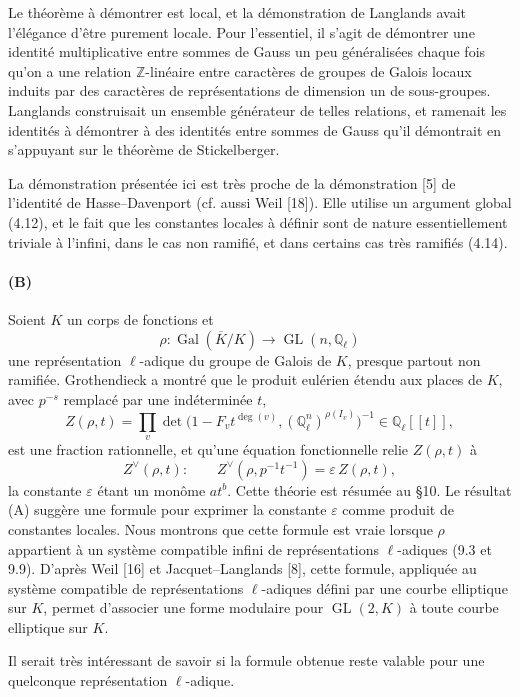 \documentclass[10pt]{article}
\newcommand{\Q}{\mathbb Q}
\newcommand{\Z}{\mathbb Z}
\newcommand{\Gal}{\operatorname{Gal}}
\newcommand{\GL}{\operatorname{GL}}
\providecommand{\Gal}{\operatorname{Gal}}
\providecommand{\GL}{\operatorname{GL}}
\providecommand{\Gal}{\operatorname{Gal}}
\providecommand{\GL}{\operatorname{GL}}
\providecommand{\Gal}{\operatorname{Gal}}
\providecommand{\Gal}{\operatorname{Gal}}
\begin{document}
Le théorème à démontrer est local, et la démonstration de Langlands avait l'élégance d'être purement locale. Pour l'essentiel, il s'agit de démontrer une identité multiplicative entre sommes de Gauss un peu généralisées chaque fois qu'on a une relation \(\Z\)-linéaire entre caractères de groupes de Galois locaux induits par des caractères de représentations de dimension un de sous-groupes. Langlands construisait un ensemble générateur de telles relations, et ramenait les identités à démontrer à des identités entre sommes de Gauss qu'il démontrait en s'appuyant sur le théorème de Stickelberger.

La démonstration présentée ici est très proche de la démonstration [5] de l'identité de Hasse--Davenport (cf. aussi Weil [18]). Elle utilise un argument global (4.12), et le fait que les constantes locales à définir sont de nature essentiellement triviale à l'infini, dans le cas non ramifié, et dans certains cas très ramifiés (4.14).

\paragraph{(B)} Soient \(K\) un corps de fonctions et
\[
\rho:\Gal(\overline K/K)\longrightarrow \GL(n,\Q_\ell)
\]
une représentation \(\ell\)-adique du groupe de Galois de \(K\), presque partout non ramifiée. Grothendieck a montré que le produit eulérien étendu aux places de \(K\), avec \(p^{-s}\) remplacé par une indéterminée \(t\),
\[
Z(\rho,t)=\prod_v\det\bigl(1-F_vt^{\deg(v)},(\Q_\ell^n)^{\rho(I_v)}\bigr)^{-1}
\in\Q_\ell[[t]],
\]
est une fraction rationnelle, et qu'une équation fonctionnelle relie \(Z(\rho,t)\) à
\[
Z^\vee(\rho,t):
\qquad
Z^\vee(\rho,p^{-1}t^{-1})=\varepsilon\, Z(\rho,t),
\]
la constante \(\varepsilon\) étant un monôme \(at^b\). Cette théorie est résumée au §10. Le résultat (A) suggère une formule pour exprimer la constante \(\varepsilon\) comme produit de constantes locales. Nous montrons que cette formule est vraie lorsque \(\rho\) appartient à un système compatible infini de représentations \(\ell\)-adiques (9.3 et 9.9). D'après Weil [16] et Jacquet--Langlands [8], cette formule, appliquée au système compatible de représentations \(\ell\)-adiques défini par une courbe elliptique sur \(K\), permet d'associer une forme modulaire pour \(\GL(2,K)\) à toute courbe elliptique sur \(K\).

Il serait très intéressant de savoir si la formule obtenue reste valable pour une quelconque représentation \(\ell\)-adique.
\end{document}
